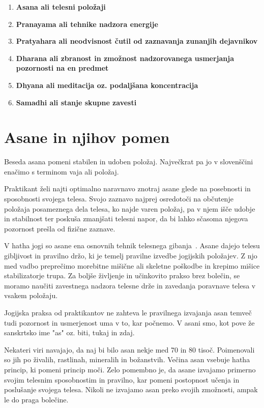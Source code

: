 \documentclass[a4paper, 12pt]{book}
\begin{document}
\begin{enumerate}
	\item \textbf{Asana ali telesni položaji}
	\item \textbf{Pranayama ali tehnike nadzora energije}
	\item \textbf{Pratyahara ali neodvisnost čutil od zaznavanja zunanjih dejavnikov}
	\item \textbf{Dharana ali zbranost in zmožnost nadzorovanega usmerjanja pozornosti na en predmet}
	\item \textbf{Dhyana ali meditacija oz. podaljšana koncentracija}
	\item \textbf{Samadhi ali stanje skupne zavesti}
\end{enumerate}


\section{Asane in njihov pomen}
Beseda asana pomeni stabilen in udoben položaj. Največkrat pa jo v slovenščini enačimo s terminom vaja ali položaj.

Praktikant želi najti optimalno naravnavo znotraj asane glede na posebnosti in sposobnosti svojega telesa. Svojo zaznavo najprej osredotoči na občutenje položaja posameznega dela telesa, ko najde varen položaj, pa v njem išče udobje in stabilnost ter poskuša zmanjšati telesni napor, da bi lahko sčasoma njegova pozornost prešla od fizične zaznave.

V hatha jogi so asane ena osnovnih tehnik telesnega gibanja~\cite{Asane}. Asane dajejo telesu gibljivost in pravilno držo, ki je temelj pravilne izvedbe jogijskih položajev. Z njo med vadbo preprečimo morebitne mišične ali skeletne poškodbe in krepimo mišice stabilizatorje trupa. Za boljše življenje in učinkovito prakso brez bolečin, se moramo naučiti zavestnega nadzora telesne drže in zavedanja poravnave telesa v vsakem položaju.

Jogijska praksa od praktikantov ne zahteva le pravilnega izvajanja asan temveč tudi pozornost in usmerjenost uma v to, kar počnemo. V asani smo, kot pove že sanskrtsko ime "as" oz. biti, tukaj in zdaj.

Nekateri viri navajajo, da naj bi bilo asan nekje med 70 in 80 tisoč. Poimenovali so jih po živalih, rastlinah, mineralih in  božanstvih. Večina asan vsebuje hatha princip, ki pomeni princip moči. Zelo pomembno je, da asane izvajamo primerno svojim telesnim sposobnostim in pravilno, kar pomeni postopnost učenja in poslušanje svojega telesa. Nikoli ne izvajamo asan preko svojih zmožnosti, ampak le do praga bolečine. 
\end{document}

